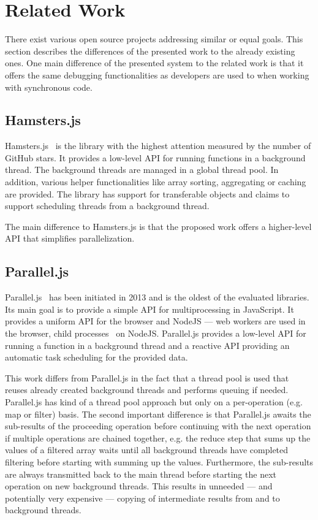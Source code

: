 \section{Related Work}\label{sec:related-work}
There exist various open source projects addressing similar or equal goals. This section describes the differences of the presented work to the already existing ones. One main difference of the presented system to the related work is that it offers the same debugging functionalities as developers are used to when working with synchronous code.

\subsection{Hamsters.js}
Hamsters.js~\cite{hamstersjs} is the library with the highest attention measured by the number of GitHub stars. It provides a low-level API for running functions in a background thread. The background threads are managed in a global thread pool. In addition, various helper functionalities like array sorting, aggregating or caching are provided. The library has support for transferable objects and claims to support scheduling threads from a background thread. 

The main difference to Hamsters.js is that the proposed work offers a higher-level API that simplifies parallelization. 

\subsection{Parallel.js}
Parallel.js~\cite{SavitzkyMayr2016} has been initiated in 2013 and is the oldest of the evaluated libraries. Its main goal is to provide a simple API for multiprocessing in JavaScript. It provides a uniform API for the browser and NodeJS --- web workers are used in the browser, child processes~\cite{childProcess} on NodeJS. Parallel.js provides a low-level API for running a function in a background thread and a reactive API providing an automatic task scheduling for the provided data. 

This work differs from Parallel.js in the fact that a thread pool is used that reuses already created background threads and performs queuing if needed. Parallel.js has kind of a thread pool approach but only on a per-operation (e.g. map or filter) basis. The second important difference is that Parallel.js awaits the sub-results of the proceeding operation before continuing with the next operation if multiple operations are chained together, e.g. the reduce step that sums up the values of a filtered array waits until all background threads have completed filtering before starting with summing up the values. Furthermore, the sub-results are always transmitted back to the main thread before starting the next operation on new background threads. This results in unneeded --- and potentially very expensive --- copying of intermediate results from and to background threads.


